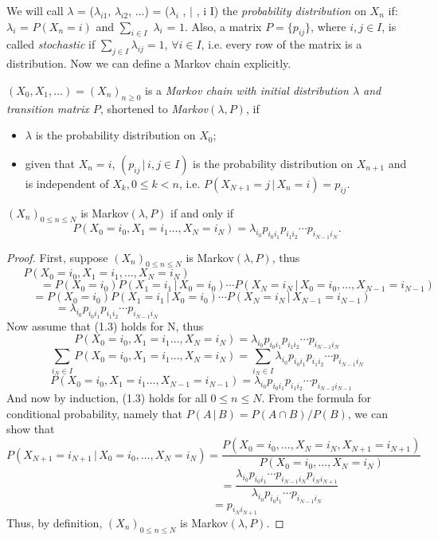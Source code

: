 We will call $\lambda$ = ($\lambda_{i1}$, $\lambda_{i2}$, $\ldots$) = ($\lambda_{i}$ , $|$ , i \in I) the \emph{probability distribution} on $X_{n}$ if:
\newline
$\lambda_{i}$ = $P(X_{n} = i)$ and $\sum_{i \in I}$ $\lambda_{i}$ = $1$. Also, a matrix $P = \{ p_{ij} \}$, where $i,j \in I$, is called \emph{stochastic} if $\sum_{j \in I} \lambda_{ij} = 1$, $\forall i \in I$, i.e. every row of the matrix is a distribution. Now we can define a Markov chain explicitly.
\newline
\begin{defn}
$(X_0, X_1, \ldots) = (X_n)_{n \geq 0}$ is a \emph{Markov chain with initial distribution $\lambda$ and transition matrix $P$}, shortened to \emph{Markov$(\lambda , P)$}, if
\begin{itemize}
\item $\lambda$ is the probability distribution on $X_0$;
\item given that $X_n = i$, $(p_{ij} \, | \, i,j \in I)$ is the probability distribution on $X_{n+1}$ and is independent of $X_k, 0 \leq k < n$, i.e. $P(X_{N+1}=j \, | \, X_n=i) = p_{ij}$.
\end{itemize}
\end{defn}
\newline
\begin{thm} $(X_n)_{0 \leq n \leq N}$ is Markov$(\lambda, P)$ if and only if
\begin{equation} P(X_0=i_0, X_1=i_1 \ldots , X_N=i_N) = \lambda_{i_0}p_{i_0i_1}p_{i_1i_2}\cdots p_{i_{N-1}i_N}.
\end{equation}
\end{thm}
\begin{proof} First, suppose $(X_n)_{0 \leq n \leq N}$ is Markov$(\lambda, P)$, thus
\[ P(X_0=i_0,X_1=i_1, \ldots , X_N=i_N) \qquad\qquad\qquad\qquad\qquad\qquad\qquad\qquad\qquad\]
\[ \qquad \quad = P(X_0=i_0)P(X_1=i_1 \, | \, X_0=i_0) \cdots P(X_N=i_N\, | \, X_0=i_0, \ldots, X_{N-1}=i_{N-1})\]
\[ \! = P(X_0=i_0)P(X_1=i_1 \, | \, X_0=i_0) \cdots P(X_N=i_N\, | \, X_{N-1}=i_{N-1})\quad\]
\[\!\!\!\!\!\! = \lambda_{i_0}p_{i_0i_1}p_{i_1i_2}\cdots p_{i_{N-1}i_N} \qquad\qquad\qquad\qquad\qquad\qquad\qquad\qquad\qquad\]
Now assume that (1.3) holds for N, thus
\[P(X_0=i_0, X_1=i_1 \ldots , X_N=i_N) = \lambda_{i_0}p_{i_0i_1}p_{i_1i_2}\cdots p_{i_{N-1}i_N} \]
\[\sum_{i_N \in I} P(X_0=i_0, X_1=i_1 \ldots , X_N=i_N) = \sum_{i_N \in I} \lambda_{i_0}p_{i_0i_1}p_{i_1i_2}\cdots p_{i_{N-1}i_N} \]
\[\!P(X_0=i_0, X_1=i_1 \ldots , X_{N-1}=i_{N-1}) = \lambda_{i_0}p_{i_0i_1}p_{i_1i_2}\cdots p_{i_{N-2}i_{N-1}} \quad\]
And now by induction, (1.3) holds for all $0 \leq n \leq N$. From the formula for conditional probability, namely that $P(A\,|\,B)=P(A \cap B)/P(B)$, we can show that
\[P(X_{N+1}=i_{N+1}\, | \, X_0=i_0, \ldots, X_N=i_N) = \frac{P(X_0=i_0, \ldots ,  X_N=i_N, X_{N+1}=i_{N+1})}{P(X_0=i_0, \ldots , X_N=i_N)} \]
\[\qquad\qquad\qquad\qquad\qquad\qquad\quad\! = \frac{\lambda_{i_0}p_{i_0i_1}\cdots p_{i_{N-1}i_N}p_{i_Ni_{N+1}}}{\lambda_{i_0}p_{i_0i_1}\cdots p_{i_{N-1}i_N}} \]
\[ \qquad\qquad\quad \! \! \! = p_{i_Ni_{N+1}} \]
Thus, by definition, $(X_n)_{0 \leq n \leq N}$ is Markov$(\lambda, P)$.
\end{proof}

